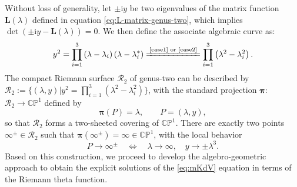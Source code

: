 \documentclass[11pt,reqno]{amsart}
\newcommand{\ii}{\mathrm{i}}
\numberwithin{equation}{section}
\begin{document}
Without loss of generality, let $\pm \ii y$ be two eigenvalues of the matrix function $\mathbf{L}(\lambda)$ defined in equation \eqref{eq:L-matrix-genus-two}, which implies $\det\left(\pm \ii y-\mathbf{L}(\lambda)\right)=0$. 
We then define the associate algebraic curve as:
\begin{equation}\label{eq:define-curve-algebro}
	y^2=\prod_{i=1}^{3}\left(\lambda-\lambda_i\right)\left(\lambda-\lambda_i^*\right)\xlongequal{\text{\ref{case1} or \ref{case2}}}\prod_{i=1}^{3}\left(\lambda^2-\lambda_i^2\right).
\end{equation} 
The compact Riemann surface $\mathcal{R}_2$ of genus-two can be described by $\mathcal{R}_2:=\{ (\lambda,y) | y^2=\prod_{i=1}^{3}(\lambda^2-\lambda_i^2)\}$,
with the standard projection $\boldsymbol{\pi}$: $\mathcal{R}_2\rightarrow \mathbb{CP}^1$ defined by
\begin{equation}\label{eq:define-p-y}
	\boldsymbol{\pi}(P)=\lambda,\qquad P=(\lambda,y),
\end{equation}
so that $\mathcal{R}_2$ forms a two-sheeted covering of $\mathbb{CP}^1$.
There are exactly two points $\infty^{\pm}\in \mathcal{R}_2$ such that $\boldsymbol{\pi} (\infty^{\pm})=\infty \in \mathbb{CP}^1$, with the local behavior
\begin{equation}\label{eq:define-standard-projection}
	P\rightarrow \infty ^{\pm} \quad \Leftrightarrow \quad  \lambda\rightarrow \infty, \quad y \rightarrow \pm 
	\lambda^{3}.
\end{equation}
Based on this construction, we proceed to develop the algebro-geometric approach to obtain the explicit solutions of the \ref{eq:mKdV} equation in terms of the Riemann theta function.
\end{document}
